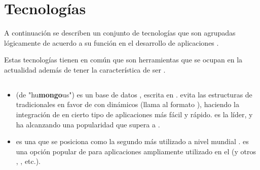 
\section{Tecnologías }\label{cap:estadoArte:tecnologias}
A continuación se describen un conjunto de tecnologías que son agrupadas lógicamente de acuerdo a su función en el desarrollo de aplicaciones \webINT.

Estas tecnologías tienen en común que son herramientas que se ocupan en la actualidad además de tener la característica de ser \openSourcePC. 

\subsection{\dataBaseDB}

	\begin{itemize}
		\item
			\textbf{\mongodbNAME} (de "hu\textbf{mongo}us") es un base de datos \documentOriented \openSourcePC, escrita en \cPlusPlus \cite{technology_mongodb}. \mongodbNAME evita las estructuras de \dataBaseDB tradicionales \tableBasedDB en favor de \documentsDB \jsonLikeCPT con \schemasDB dinámicos (\mongodbNAME llama al formato \bsonNAME), haciendo la integración de \dataPC en cierto tipo de aplicaciones más fácil y rápido. \mongodbNAME es la \nosqlNAME líder, y ha alcanzando una popularidad que supera a \postgresql \cite{online_db_engines_ranking}.
	
		\item
			\textbf{\mysqlNAME} es una \rdbms \openSourcePC que se posiciona como la  segundo más utilizado a nivel mundial \cite{online_db_engines_ranking}\cite{online_dispelling_myths}. \mysqlNAME es una opción popular de \dataBaseDB para aplicaciones \webINT ampliamente utilizado en el \stackAS \lampNAME (y otros \stacksAS, \ampNAME, etc.).
	

\end{itemize}
